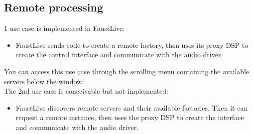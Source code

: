 \documentclass[a4paper]{article}
\begin{document}
\newpage
\subsection {Remote processing} \label{remoteprocessing}

1 use case is implemented in FaustLive:
\begin{itemize}
\item FaustLive sends code to create a remote factory, then uses its proxy DSP to create the control interface and communicate with the audio driver.
\end{itemize}
You can access this use case through the scrolling menu containing the available servers below the window. \\

The 2nd use case is conceivable but not implemented:
\begin{itemize}
\item FaustLive discovers remote servers and their available factories. Then it can request a remote instance, then uses the proxy DSP to create the interface and communicate with the audio driver.
\end{itemize}
\end{document}
